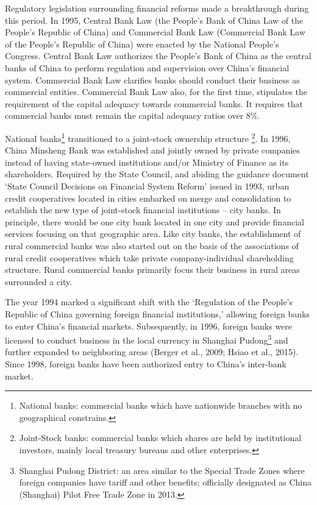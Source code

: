 \documentclass[
  letterpaper,
  DIV=11,
  numbers=noendperiod]{scrreprt}
\begin{document}
Regulatory legislation surrounding financial reforms made a breakthrough
during this period. In 1995, Central Bank Law (the People's Bank of
China Law of the People's Republic of China) and Commercial Bank Law
(Commercial Bank Law of the People's Republic of China) were enacted by
the National People's Congress. Central Bank Law authorizes the People's
Bank of China as the central banks of China to perform regulation and
supervision over China's financial system. Commercial Bank Law clarifies
banks should conduct their business as commercial entities. Commercial
Bank Law also, for the first time, stipulates the requirement of the
capital adequacy towards commercial banks. It requires that commercial
banks must remain the capital adequacy ratios over 8\%.

National banks\footnote{National banks: commercial banks which have
  nationwide branches with no geographical constrains.} transitioned to
a joint-stock ownership structure \footnote{Joint-Stock banks:
  commercial banks which shares are held by institutional investors,
  mainly local treasury bureaus and other enterprises.}. In 1996, China
Minsheng Bank was established and jointly owned by private companies
instead of having state-owned institutions and/or Ministry of Finance as
its shareholders. Required by the State Council, and abiding the
guidance document `State Council Decisions on Financial System Reform'
issued in 1993, urban credit cooperatives located in cities embarked on
merge and consolidation to establish the new type of joint-stock
financial institutions -- city banks. In principle, there would be one
city bank located in one city and provide financial services focusing on
that geographic area. Like city banks, the establishment of rural
commercial banks was also started out on the basis of the associations
of rural credit cooperatives which take private company-individual
shareholding structure. Rural commercial banks primarily focus their
business in rural areas surrounded a city.

The year 1994 marked a significant shift with the `Regulation of the
People's Republic of China governing foreign financial institutions,'
allowing foreign banks to enter China's financial markets. Subsequently,
in 1996, foreign banks were licensed to conduct business in the local
currency in Shanghai Pudong\footnote{Shanghai Pudong District: an area
  similar to the Special Trade Zones where foreign companies have tariff
  and other benefits; officially designated as China (Shanghai) Pilot
  Free Trade Zone in 2013.} and further expanded to neighboring areas
(Berger et al., 2009; Hsiao et al., 2015). Since 1998, foreign banks
have been authorized entry to China's inter-bank market.
\end{document}

